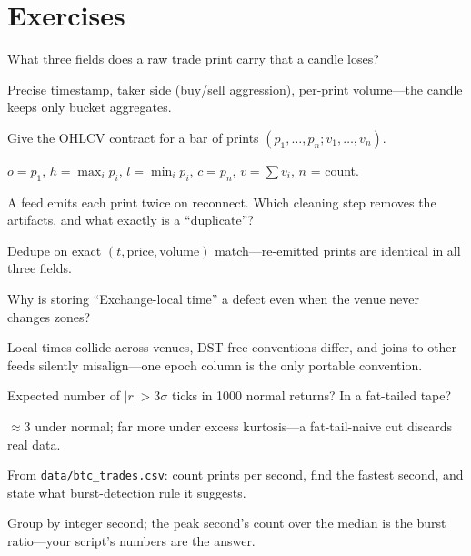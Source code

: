 \section{Exercises}
\begin{exercise}[easy]
What three fields does a raw trade print carry that a candle loses?
\end{exercise}
\begin{solution}
Precise timestamp, taker side (buy/sell aggression), per-print volume---the candle keeps only
bucket aggregates.
\end{solution}

\begin{exercise}[easy]
Give the OHLCV contract for a bar of prints
$(p_1,\dots,p_n;v_1,\dots,v_n)$.
\end{exercise}
\begin{solution}
$o=p_1$, $h=\max_i p_i$, $l=\min_i p_i$, $c=p_n$, $v=\sum v_i$, $n$ = count.
\end{solution}

\begin{exercise}[easy]
A feed emits each print twice on reconnect. Which cleaning step removes the artifacts, and
what exactly is a ``duplicate''?
\end{exercise}
\begin{solution}
Dedupe on exact $(t,\text{price},\text{volume})$ match---re-emitted prints are identical in
all three fields.
\end{solution}

\begin{exercise}[easy]
Why is storing ``Exchange-local time'' a defect even when the venue never changes zones?
\end{exercise}
\begin{solution}
Local times collide across venues, DST-free conventions differ, and joins to other feeds
silently misalign---one epoch column is the only portable convention.
\end{solution}

\begin{exercise}[easy]
Expected number of $|r|>3\sigma$ ticks in 1000 normal returns? In a fat-tailed tape?
\end{exercise}
\begin{solution}
$\approx3$ under normal; far more under excess kurtosis---a fat-tail-naive cut discards real
data.
\end{solution}

\begin{exercise}
From \texttt{data/btc\_trades.csv}: count prints per second, find the fastest second, and
state what burst-detection rule it suggests.
\end{exercise}
\begin{solution}
Group by integer second; the peak second's count over the median is the burst ratio---your
script's numbers are the answer.
\end{solution}

